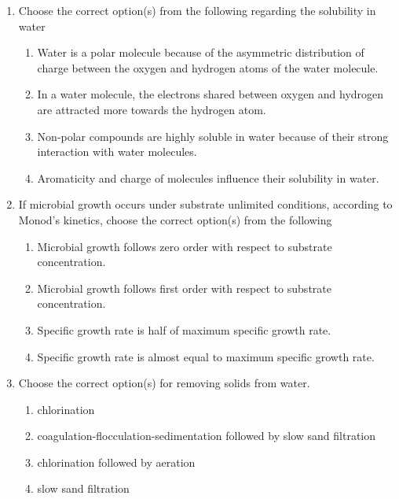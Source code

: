 \documentclass[journal]{IEEEtran}
\begin{document}
\begin{enumerate}[resume]
\item Choose the correct option(s) from the following regarding the solubility in water
\hfill{}
\begin{enumerate}
\item Water is a polar molecule because of the asymmetric distribution of charge between the oxygen and hydrogen atoms of the water molecule.
\item In a water molecule, the electrons shared between oxygen and hydrogen are attracted more towards the hydrogen atom.
\item Non-polar compounds are highly soluble in water because of their strong interaction with water molecules.
\item Aromaticity and charge of molecules influence their solubility in water.
\end{enumerate}

\item If microbial growth occurs under substrate unlimited conditions, according to Monod's kinetics, choose the correct option(s) from the following
\hfill{}
\begin{enumerate}
\item Microbial growth follows zero order with respect to substrate concentration.
\item Microbial growth follows first order with respect to substrate concentration.
\item Specific growth rate is half of maximum specific growth rate.
\item Specific growth rate is almost equal to maximum specific growth rate.
\end{enumerate}

\item Choose the correct option(s) for removing solids from water.
\hfill{}
\begin{enumerate}
\item chlorination
\item coagulation-flocculation-sedimentation followed by slow sand filtration
\item chlorination followed by aeration
\item slow sand filtration
\end{enumerate}


\end{enumerate}
\end{document}
